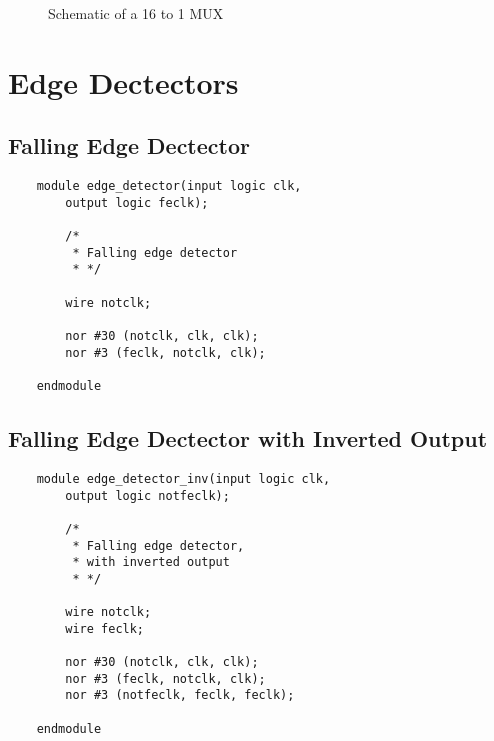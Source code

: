 \documentclass[../main]{subfiles}
\begin{document}
\begin{figure} [!ht]
{
    }
    \caption{Schematic of a 16 to 1 MUX}
\end{figure}

\section {Edge Dectectors}

\subsection {Falling Edge Dectector}

\begin{verbatim}
    module edge_detector(input logic clk,
        output logic feclk);

        /*
         * Falling edge detector
         * */

        wire notclk;

        nor #30 (notclk, clk, clk);
        nor #3 (feclk, notclk, clk);

    endmodule
\end{verbatim}

\subsection {Falling Edge Dectector with Inverted Output}

\begin{verbatim}
    module edge_detector_inv(input logic clk,
        output logic notfeclk);

        /*
         * Falling edge detector,
         * with inverted output
         * */

        wire notclk;
        wire feclk;

        nor #30 (notclk, clk, clk);
        nor #3 (feclk, notclk, clk);
        nor #3 (notfeclk, feclk, feclk);

    endmodule
\end{verbatim}
\end{document}
